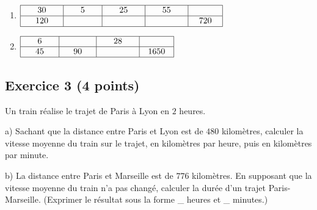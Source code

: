 \documentclass[14 pt]{extarticle}
\theoremstyle{plain}
\begin{document}
\begin{enumerate}
\item $\renewcommand{\arraystretch}{1}
\begin{array}{|c|c|c|c|c|}
\hline
\phantom{000}30 \phantom{000} &\phantom{000}5\phantom{000} &  \phantom{000}25\phantom{000} &   \phantom{000}55\phantom{000} & \phantom{000} \phantom{000} \\
\hline
120 & & \phantom{700} &    & 720 \\
\hline
\end{array}
\renewcommand{\arraystretch}{1}$

\item $\renewcommand{\arraystretch}{1}
\begin{array}{|c|c|c|c|}
\hline
\phantom{000}6\phantom{000}  & \phantom{000} \ \phantom{000} & \phantom{000}28\phantom{000}& \phantom{000}\phantom{000}   \\
\hline
45  & 90& &1650\\
\hline
\end{array}
\renewcommand{\arraystretch}{1}$
\end{enumerate}

\subsection*{Exercice 3 (4 points)}

Un train réalise le trajet de Paris à Lyon en $2$ heures. 

a) Sachant que la distance entre Paris et Lyon est de $480$ 
kilomètres, calculer la vitesse moyenne du train sur le trajet, en kilomètres par heure, puis en kilomètres par minute. 

b) La distance entre Paris et Marseille est de $776$ kilomètres. En 
supposant que la vitesse moyenne du train n'a pas changé, calculer la durée d'un trajet Paris-Marseille. (Exprimer le résultat sous la forme \_ heures et \_ minutes.)

 
 


 	
\end{document}
